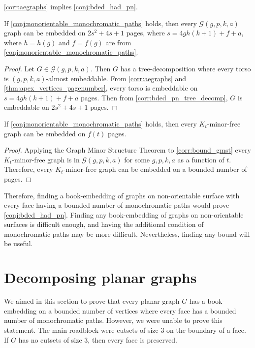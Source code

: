 \cref{corr:aegraphs} implies \cref{conj:bded_had_pn}.
\begin{corollary}\label{corr:bound_gmst}
	If \cref{conj:nonorientable_monochromatic_paths} holds, then every $\mathcal{G}(g, p, k, a)$ graph can be embedded on $2s^2 + 4s + 1$ pages, where $s =  4g h (k + 1) + f + a$, where $h = h(g)$ and $f = f(g)$ are from \cref{conj:nonorientable_monochromatic_paths}. 
\end{corollary}

\begin{proof}
	Let $G \in \mathcal{G}(g, p, k, a)$. Then $G$ has a tree-decomposition where every torso is $(g, p, k, a)$-almost embeddable. From \cref{corr:aegraphs} and \cref{thm:apex_vertices_pagenumber}, every torso is embeddable on $s = 4g h (k + 1) + f + a$ pages. Then from \cref{corr:bded_pn_tree_decomp}, $G$ is embeddable on $2s^2 + 4s + 1$ pages.
\end{proof}

\begin{corollary}
	If \cref{conj:nonorientable_monochromatic_paths} holds, then every $K_t$-minor-free graph can be embedded on $f(t)$ pages. 
\end{corollary}

\begin{proof}
	Applying the Graph Minor Structure Theorem to \cref{corr:bound_gmst} every $K_t$-minor-free graph is in $\mathcal{G}(g, p, k, a)$ for some $g, p, k, a$ as a function of $t$. Therefore, every $K_t$-minor-free graph can be embedded on a bounded number of pages. 
\end{proof}

Therefore, finding a book-embedding of graphs on non-orientable surface with every face having a bounded number of monochromatic paths would prove \cref{conj:bded_had_pn}. Finding any book-embedding of graphs on non-orientable surfaces is difficult enough, and having the additional condition of monochromatic paths may be more difficult. Nevertheless, finding any bound will be useful.

\section{Decomposing planar graphs}
We aimed in this section to prove that every planar graph $G$ has a book-embedding on a bounded number of vertices where every face has a bounded number of monochromatic paths. However, we were unable to prove this statement. The main roadblock were cutsets of size 3 on the boundary of a face. If $G$ has no cutsets of size 3, then every face is preserved. 

